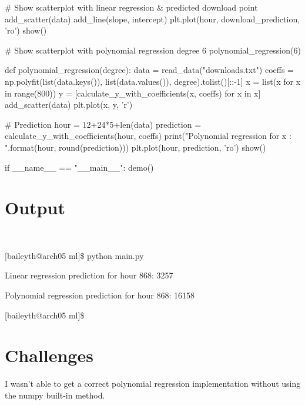 \documentclass{article}
\begin{document}
\begin{python}
    # Show scatterplot with linear regression & predicted download point
    add_scatter(data)
    add_line(slope, intercept)
    plt.plot(hour, download_prediction, 'ro')
    show()

    # Show scatterplot with polynomial regression degree 6
    polynomial_regression(6)

def polynomial_regression(degree):
    data = read_data("downloads.txt")
    coeffs = np.polyfit(list(data.keys()),
            list(data.values()), degree).tolist()[::-1]
    x = list(x for x in range(800))
    y = [calculate_y_with_coefficients(x, coeffs) for x in x]
    add_scatter(data)
    plt.plot(x, y, 'r')

    # Prediction
    hour = 12+24*5+len(data)
    prediction = calculate_y_with_coefficients(hour, coeffs)
    print("Polynomial regression for x {}: {}".format(hour,
                                round(prediction)))
    plt.plot(hour, prediction, 'ro')
    show()

if __name__ == "__main__":
    demo()
\end{python}

\section{Output}

\begin{verbatim}
    
\end{verbatim}

[baileyth@arch05 ml]\$ python main.py

Linear regression prediction for hour 868: 3257

Polynomial regression prediction for hour 868: 16158

[baileyth@arch05 ml]\$

\section{Challenges}

I wasn't able to get a correct polynomial regression implementation without using the numpy built-in method.
\end{document}
